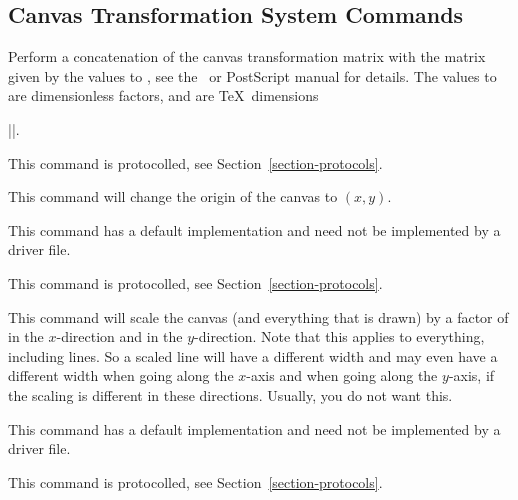 \subsection{Canvas Transformation System Commands}

\begin{command}{\pgfsys@transformcm{}}
  Perform a concatenation of the canvas transformation matrix with the
  matrix given by the values  to , see the \pdf\ or
  PostScript manual for details. The values  to  are
  dimensionless factors,  and  are \TeX\ dimensions

  \example ||.

  This command is protocolled, see Section~\ref{section-protocols}.
\end{command}


\begin{command}{\pgfsys@transformshift{}}
  This command will change the origin of the canvas to $(x,y)$.

  This command has a default implementation and need not be
  implemented by a driver file.

  This command is protocolled, see Section~\ref{section-protocols}.
\end{command}

\begin{command}{\pgfsys@transformxyscale{}}
  This command will scale the canvas (and  everything that is drawn)
  by a factor of  in the $x$-direction and  in the  $y$-direction. Note that this applies to
  everything, including  lines. So a scaled line will have a different
  width and may even have a different width when going along the
  $x$-axis and when going along the $y$-axis, if the scaling is
  different in these directions. Usually, you do not want this.

  This command has a default implementation and need not be
  implemented by a driver file.

  This command is protocolled, see Section~\ref{section-protocols}.
\end{command}


